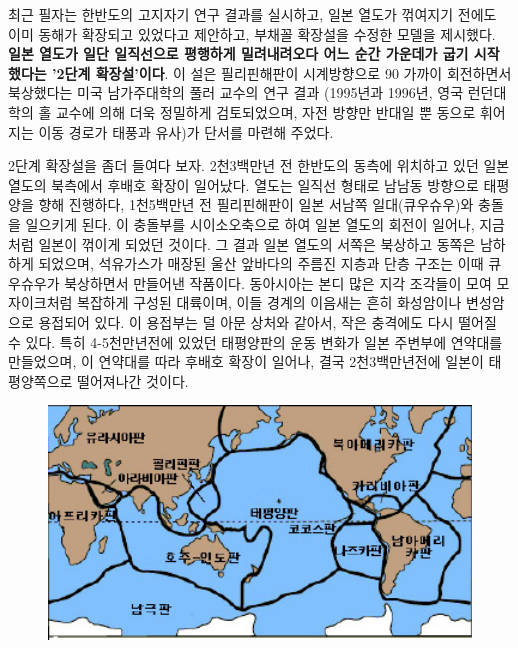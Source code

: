 \documentclass[12pt,a4paper]{book}
\begin{document}
최근 필자는 한반도의 고지자기 연구 결과를 실시하고, 일본 열도가 꺾여지기 전에도 이미 동해가 확장되고 있었다고 제안하고, 부채꼴 확장설을 수정한 모델을 제시했다. \textbf{일본 열도가 일단 일직선으로 평행하게 밀려내려오다 어느 순간 가운데가 굽기 시작했다는 '2단계 확장설'이다}. 이 설은 필리핀해판이 시계방향으로 90 가까이 회전하면서 북상했다는 미국 남가주대학의 풀러 교수의 연구 결과 (1995년과 1996년, 영국 런던대학의 홀 교수에 의해 더욱 정밀하게 검토되었으며, 자전 방향만 반대일 뿐 동으로 휘어지는 이동 경로가 태풍과 유사)가 단서를 마련해 주었다. 
\\[-1.0em]

\clearpage

2단계 확장설을 좀더 들여다 보자. 2천3백만년 전 한반도의 동측에 위치하고 있던 일본 열도의 북측에서 후배호 확장이 일어났다. 열도는 일직선 형태로 남남동 방향으로 태평양을 향해 진행하다, 1천5백만년 전 필리핀해판이 일본 서남쪽 일대(큐우슈우)와 충돌을 일으키게 된다. 이 충돌부를 시이소오축으로 하여 일본 열도의 회전이 일어나, 지금처럼 일본이 꺾이게 되었던 것이다. 그 결과 일본 열도의 서쪽은 북상하고 동쪽은 남하하게 되었으며, 석유가스가 매장된 울산 앞바다의 주름진 지층과 단층 구조는 이때 큐우슈우가 북상하면서 만들어낸 작품이다. 
동아시아는 본디 많은 지각 조각들이 모여 모자이크처럼 복잡하게 구성된 대륙이며, 이들 경계의 이음새는 흔히 화성암이나 변성암으로 용접되어 있다. 이 용접부는 덜 아문 상처와 같아서, 작은 충격에도 다시 떨어질 수 있다. 특히 4-5천만년전에 있었던 태평양판의 운동 변화가 일본 주변부에 연약대를 만들었으며, 이 연약대를 따라 후배호 확장이 일어나, 결국 2천3백만년전에 일본이 태평양쪽으로 떨어져나간 것이다. 

		\begin{figure}[h!] 
		\includegraphics[width=1.0\textwidth]{./fig/plate-001.pdf}
		\end{figure}


\clearpage
\end{document}
